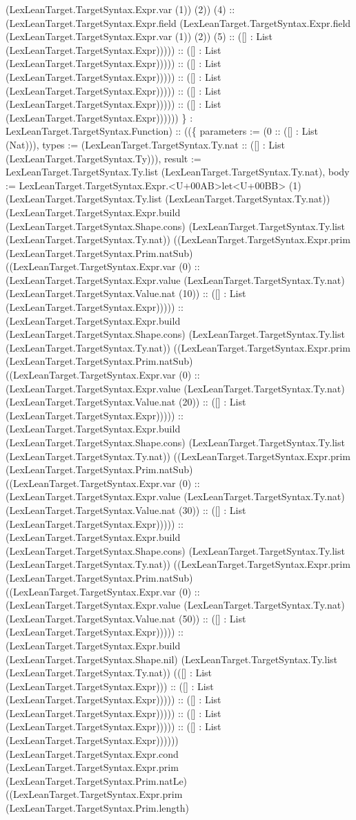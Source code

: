 \documentclass[11pt]{article}
\begin{document}
(LexLeanTarget.TargetSyntax.Expr.var (1)) (2)) (4) :: (LexLeanTarget.TargetSyntax.Expr.field (LexLeanTarget.TargetSyntax.Expr.field (LexLeanTarget.TargetSyntax.Expr.var (1)) (2)) (5) :: ([] : List (LexLeanTarget.TargetSyntax.Expr))))) :: ([] : List (LexLeanTarget.TargetSyntax.Expr))))) :: ([] : List (LexLeanTarget.TargetSyntax.Expr))))) :: ([] : List (LexLeanTarget.TargetSyntax.Expr))))) :: ([] : List (LexLeanTarget.TargetSyntax.Expr))))) :: ([] : List (LexLeanTarget.TargetSyntax.Expr)))))) \} : LexLeanTarget.TargetSyntax.Function) :: ((\{ parameters := (0 :: ([] : List (Nat))), types := (LexLeanTarget.TargetSyntax.Ty.nat :: ([] : List (LexLeanTarget.TargetSyntax.Ty))), result := LexLeanTarget.TargetSyntax.Ty.list (LexLeanTarget.TargetSyntax.Ty.nat), body := LexLeanTarget.TargetSyntax.Expr.<U+00AB>let<U+00BB> (1) (LexLeanTarget.TargetSyntax.Ty.list (LexLeanTarget.TargetSyntax.Ty.nat)) (LexLeanTarget.TargetSyntax.Expr.build (LexLeanTarget.TargetSyntax.Shape.cons) (LexLeanTarget.TargetSyntax.Ty.list (LexLeanTarget.TargetSyntax.Ty.nat)) ((LexLeanTarget.TargetSyntax.Expr.prim (LexLeanTarget.TargetSyntax.Prim.natSub) ((LexLeanTarget.TargetSyntax.Expr.var (0) :: (LexLeanTarget.TargetSyntax.Expr.value (LexLeanTarget.TargetSyntax.Ty.nat) (LexLeanTarget.TargetSyntax.Value.nat (10)) :: ([] : List (LexLeanTarget.TargetSyntax.Expr))))) :: (LexLeanTarget.TargetSyntax.Expr.build (LexLeanTarget.TargetSyntax.Shape.cons) (LexLeanTarget.TargetSyntax.Ty.list (LexLeanTarget.TargetSyntax.Ty.nat)) ((LexLeanTarget.TargetSyntax.Expr.prim (LexLeanTarget.TargetSyntax.Prim.natSub) ((LexLeanTarget.TargetSyntax.Expr.var (0) :: (LexLeanTarget.TargetSyntax.Expr.value (LexLeanTarget.TargetSyntax.Ty.nat) (LexLeanTarget.TargetSyntax.Value.nat (20)) :: ([] : List (LexLeanTarget.TargetSyntax.Expr))))) :: (LexLeanTarget.TargetSyntax.Expr.build (LexLeanTarget.TargetSyntax.Shape.cons) (LexLeanTarget.TargetSyntax.Ty.list (LexLeanTarget.TargetSyntax.Ty.nat)) ((LexLeanTarget.TargetSyntax.Expr.prim (LexLeanTarget.TargetSyntax.Prim.natSub) ((LexLeanTarget.TargetSyntax.Expr.var (0) :: (LexLeanTarget.TargetSyntax.Expr.value (LexLeanTarget.TargetSyntax.Ty.nat) (LexLeanTarget.TargetSyntax.Value.nat (30)) :: ([] : List (LexLeanTarget.TargetSyntax.Expr))))) :: (LexLeanTarget.TargetSyntax.Expr.build (LexLeanTarget.TargetSyntax.Shape.cons) (LexLeanTarget.TargetSyntax.Ty.list (LexLeanTarget.TargetSyntax.Ty.nat)) ((LexLeanTarget.TargetSyntax.Expr.prim (LexLeanTarget.TargetSyntax.Prim.natSub) ((LexLeanTarget.TargetSyntax.Expr.var (0) :: (LexLeanTarget.TargetSyntax.Expr.value (LexLeanTarget.TargetSyntax.Ty.nat) (LexLeanTarget.TargetSyntax.Value.nat (50)) :: ([] : List (LexLeanTarget.TargetSyntax.Expr))))) :: (LexLeanTarget.TargetSyntax.Expr.build (LexLeanTarget.TargetSyntax.Shape.nil) (LexLeanTarget.TargetSyntax.Ty.list (LexLeanTarget.TargetSyntax.Ty.nat)) (([] : List (LexLeanTarget.TargetSyntax.Expr))) :: ([] : List (LexLeanTarget.TargetSyntax.Expr))))) :: ([] : List (LexLeanTarget.TargetSyntax.Expr))))) :: ([] : List (LexLeanTarget.TargetSyntax.Expr))))) :: ([] : List (LexLeanTarget.TargetSyntax.Expr)))))) (LexLeanTarget.TargetSyntax.Expr.cond (LexLeanTarget.TargetSyntax.Expr.prim (LexLeanTarget.TargetSyntax.Prim.natLe) ((LexLeanTarget.TargetSyntax.Expr.prim (LexLeanTarget.TargetSyntax.Prim.length) 
\end{document}
